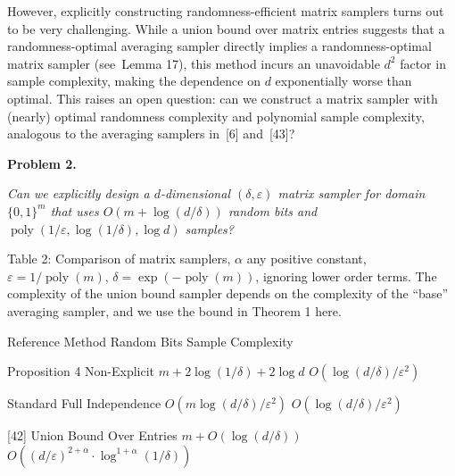 


However, explicitly constructing randomness-efficient matrix samplers turns out to be very challenging. While a union bound over matrix entries suggests that a randomness-optimal averaging sampler directly implies a randomness-optimal matrix sampler (see Lemma 17), this method incurs an unavoidable $d^{2}$ factor in sample complexity, making the dependence on $d$ exponentially worse than optimal.
This raises an open question: can we construct a matrix sampler with (nearly) optimal randomness complexity and polynomial sample complexity, analogous to the averaging samplers in [6] and [43]?\par





\par\medskip\noindent\textbf{
\textbf{Problem 2}\textbf{.}
}\par



\emph{Can we explicitly design a $d$-dimensional $(\delta,\varepsilon)$ matrix sampler for domain $\{0,1\}^{m}$ that uses $O(m+\log(d/\delta))$ random bits and $\operatorname*{poly}(1/\varepsilon,\log(1/\delta),\log d)$ samples?}\par





Table 2: Comparison of matrix samplers, $\alpha$ any positive constant, $\varepsilon=1/\operatorname*{poly}(m)$, $\delta=\exp(-\operatorname*{poly}(m))$, ignoring lower order terms. The complexity of the union bound sampler depends on the complexity of the “base” averaging sampler, and we use the bound in Theorem 1 here.




Reference 
Method 
Random Bits 
Sample Complexity 
\par


Proposition 4 
Non-Explicit 
$m+2\log(1/\delta)+2\log d$ 
$O(\log(d/\delta)/\varepsilon^{2})$ 
\par


Standard 
Full Independence 
$O(m\log(d/\delta)/\varepsilon^{2})$ 
$O(\log(d/\delta)/\varepsilon^{2})$ 
\par


[42] 
Union Bound Over Entries 
$m+O(\log(d/\delta))$ 
$O((d/\varepsilon)^{2+\alpha}\cdot\log^{1+\alpha}(1/\delta))$ 
\par



